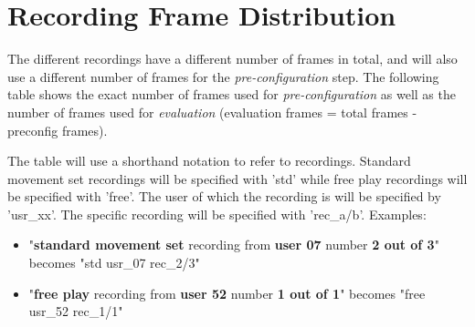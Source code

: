 \chapter{Recording Frame Distribution}
\label{appendix: recording frame distribution}

The different recordings have a different number of frames in total, and will also use a different number of frames for the \textit{pre-configuration} step. 
The following table shows the exact number of frames used for \textit{pre-configuration} as well as the number of frames used for \textit{evaluation} (evaluation frames = total frames - preconfig frames).

The table will use a shorthand notation to refer to recordings.
Standard movement set recordings will be specified with 'std' while free play recordings will be specified with 'free'.
The user of which the recording is will be specified by 'usr\_xx'.
The specific recording will be specified with 'rec\_a/b'.
Examples:
\begin{itemize}
\item "\textbf{standard movement set} recording from \textbf{user 07} number \textbf{2 out of 3}" becomes "std usr\_07 rec\_2/3"
\item "\textbf{free play} recording from \textbf{user 52} number \textbf{1 out of 1}" becomes "free usr\_52 rec\_1/1"
\end{itemize}


